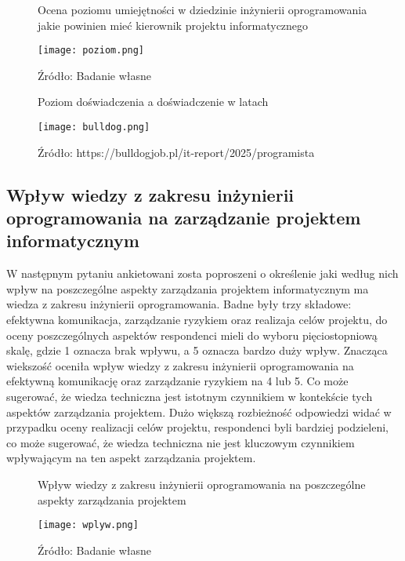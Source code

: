 \begin{figure}
  \caption{Ocena poziomu umiejętności w dziedzinie inżynierii oprogramowania jakie powinien mieć kierownik projektu informatycznego}
  \centering
  \texttt{[image: poziom.png]}
  \caption*{Źródło: Badanie własne}
\end{figure}

\begin{figure}
  \caption{Poziom doświadczenia a doświadczenie w latach}
  \centering
  \texttt{[image: bulldog.png]}
  \caption*{Źródło: https://bulldogjob.pl/it-report/2025/programista}
\end{figure}

\subsection{Wpływ wiedzy z zakresu inżynierii oprogramowania na zarządzanie projektem informatycznym}
W następnym pytaniu ankietowani zosta poproszeni o określenie jaki według nich wpływ na poszczególne aspekty zarządzania projektem informatycznym ma wiedza z zakresu inżynierii oprogramowania. Badne były trzy składowe: efektywna komunikacja, zarządzanie ryzykiem oraz realizaja celów projektu, do oceny poszczególnych aspektów respondenci mieli do wyboru pięciostopniową skalę, gdzie 1 oznacza brak wpływu, a 5 oznacza bardzo duży wpływ. Znacząca wiekszość oceniła wpływ wiedzy z zakresu inżynierii oprogramowania na efektywną komunikację oraz zarządzanie ryzykiem na 4 lub 5. Co może sugerować, że wiedza techniczna jest istotnym czynnikiem w kontekście tych aspektów zarządzania projektem. Dużo większą rozbieżność odpowiedzi widać w przypadku oceny realizacji celów projektu, respondenci byli bardziej podzieleni, co może sugerować, że wiedza techniczna nie jest kluczowym czynnikiem wpływającym na ten aspekt zarządzania projektem.

\begin{figure}
  \caption{Wpływ wiedzy z zakresu inżynierii oprogramowania na poszczególne aspekty zarządzania projektem}
  \centering
  \texttt{[image: wplyw.png]}
  \caption*{Źródło: Badanie własne}
\end{figure}


